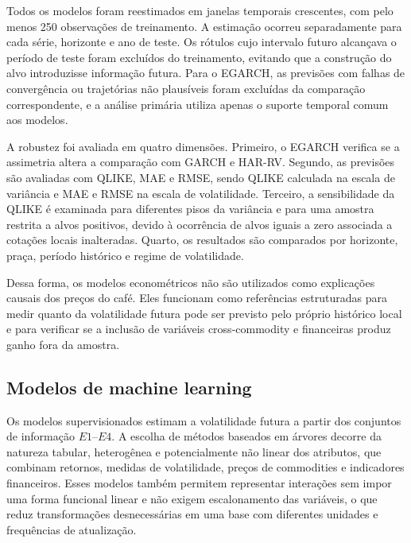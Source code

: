 \documentclass[a4paper,fleqn]{cas-sc}
\begin{document}
Todos os modelos foram reestimados em janelas temporais crescentes, com pelo menos 250 observações de treinamento. A estimação ocorreu separadamente para cada série, horizonte e ano de teste. Os rótulos cujo intervalo futuro alcançava o período de teste foram excluídos do treinamento, evitando que a construção do alvo introduzisse informação futura. Para o EGARCH, as previsões com falhas de convergência ou trajetórias não plausíveis foram excluídas da comparação correspondente, e a análise primária utiliza apenas o suporte temporal comum aos modelos.

A robustez foi avaliada em quatro dimensões. Primeiro, o EGARCH verifica se a assimetria altera a comparação com GARCH e HAR-RV. Segundo, as previsões são avaliadas com QLIKE, MAE e RMSE, sendo QLIKE calculada na escala de variância e MAE e RMSE na escala de volatilidade. Terceiro, a sensibilidade da QLIKE é examinada para diferentes pisos da variância e para uma amostra restrita a alvos positivos, devido à ocorrência de alvos iguais a zero associada a cotações locais inalteradas. Quarto, os resultados são comparados por horizonte, praça, período histórico e regime de volatilidade.

Dessa forma, os modelos econométricos não são utilizados como explicações causais dos preços do café. Eles funcionam como referências estruturadas para medir quanto da volatilidade futura pode ser previsto pelo próprio histórico local e para verificar se a inclusão de variáveis cross-commodity e financeiras produz ganho fora da amostra.

\subsection{Modelos de machine learning}
\label{subsec:ml_models}

Os modelos supervisionados estimam a volatilidade futura a partir dos conjuntos de informação \(E1\)--\(E4\). A escolha de métodos baseados em árvores decorre da natureza tabular, heterogênea e potencialmente não linear dos atributos, que combinam retornos, medidas de volatilidade, preços de commodities e indicadores financeiros. Esses modelos também permitem representar interações sem impor uma forma funcional linear e não exigem escalonamento das variáveis, o que reduz transformações desnecessárias em uma base com diferentes unidades e frequências de atualização.
\end{document}
